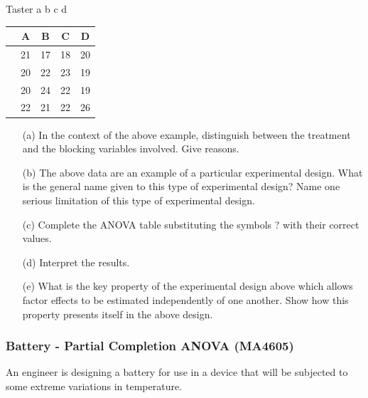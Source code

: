 \documentclass[a4paper,12pt]{article}
\begin{document}
Taster a b c d
\begin{tabular}{|c|c|c|c|c|}\hline 
&	A  & B  & C & D \\ \hline
	\hline  
	
&   21 & 17 & 18 & 20 \\
	
&	20 & 22 & 23 & 19 \\
	
&	20 & 24 & 22 & 19 \\
	
&	22 & 21 & 22 & 26 \\
	
	\hline 
\end{tabular} 



\begin{itemize}
	\item[(a)] In the context of the above example, distinguish between the treatment and the blocking variables involved. Give reasons.
	
	
	\item[(b)] The above data are an example of a particular experimental design. What is the general name given to this type of experimental design? Name one serious limitation of this type of experimental design.
	
	
	\item[(c)] Complete the ANOVA table substituting the symbols ? with their correct values.
	
	
	\item[(d)] Interpret the results.
	
	
	\item[(e)] What is the key property of the experimental design above which allows factor effects to be estimated independently of one another. Show how this property presents itself in the above design.
	
	
\end{itemize}



\subsubsection*{Battery - Partial Completion ANOVA (MA4605)}

An engineer is designing a battery for use in a device that will be subjected to some extreme variations in temperature. 
\end{document}
